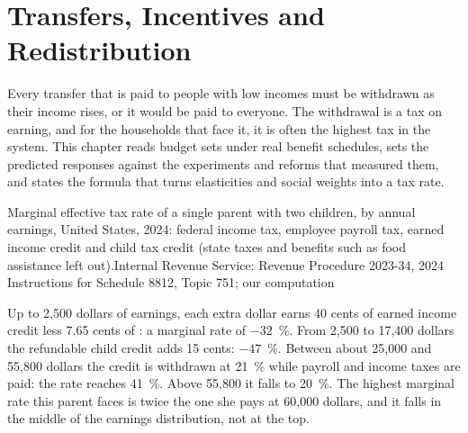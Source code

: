 \chapter{Transfers, Incentives and Redistribution}\label{ch:b3:transfers-and-incentives}

Every transfer that is paid to people with low incomes must be withdrawn as their
income rises, or it would be paid to everyone. The withdrawal is a tax on earning,
and for the households that face it, it is often the highest tax in the system.
This chapter reads budget sets under real benefit schedules, sets the predicted
responses against the experiments and reforms that measured them, and states the
formula that turns elasticities and social weights into a tax rate.

\begin{openingchart}{Marginal effective tax rate of a single parent with two
children, by annual earnings, United States, 2024: federal income tax, employee
payroll tax, earned income credit and child tax credit (state taxes and benefits
such as food assistance left out).}{Internal Revenue Service: Revenue Procedure
2023-34, 2024 Instructions for Schedule 8812, Topic 751; our computation}
\end{openingchart}

Up to 2{,}500 dollars of earnings, each extra dollar earns 40 cents of earned income
credit less 7.65 cents of : a marginal rate of $-32$~\%. From 2{,}500 to 17{,}400
dollars the refundable child credit adds 15 cents: $-47$~\%. Between about 25{,}000 and 55{,}800 dollars the credit is
withdrawn at 21~\% while payroll and income taxes are paid: the rate reaches 41~\%.
Above 55{,}800 it falls to 20~\%. The highest marginal rate this parent faces is twice
the one she pays at 60{,}000 dollars, and it falls in the middle of the earnings
distribution, not at the top.

